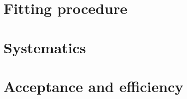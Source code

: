 %

\section{Fitting procedure}



\section{Systematics}



\section{Acceptance and efficiency}
       


